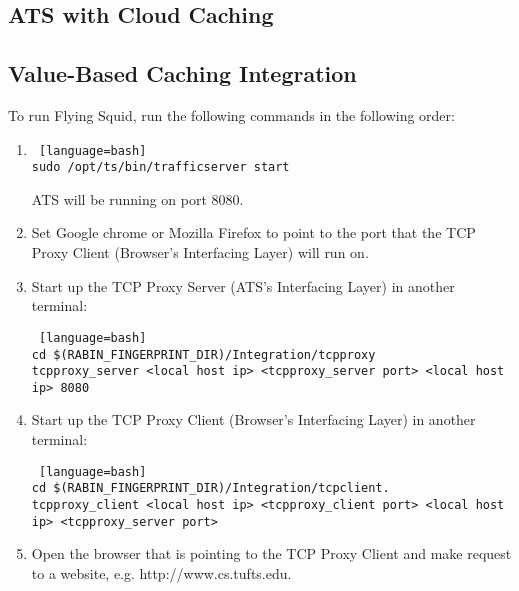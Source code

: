 \subsection{ATS with Cloud Caching}



\subsection{Value-Based Caching Integration}

To run Flying Squid, run the following commands in the following order:

\begin{enumerate}

\item 

\begin{lstlisting} [language=bash] 
sudo /opt/ts/bin/trafficserver start
\end{lstlisting}

ATS will be running on port 8080.

\item 

Set Google chrome or Mozilla Firefox to point to the port that the TCP Proxy Client (Browser's Interfacing Layer) will run on. 

\item 

Start up the TCP Proxy Server (ATS's Interfacing Layer) in another terminal:

\begin{lstlisting} [language=bash] 
cd $(RABIN_FINGERPRINT_DIR)/Integration/tcpproxy
tcpproxy_server <local host ip> <tcpproxy_server port> <local host ip> 8080
\end{lstlisting}

\item

Start up the TCP Proxy Client (Browser's Interfacing Layer) in another terminal:

\begin{lstlisting} [language=bash] 
cd $(RABIN_FINGERPRINT_DIR)/Integration/tcpclient.
tcpproxy_client <local host ip> <tcpproxy_client port> <local host ip> <tcpproxy_server port>
\end{lstlisting}

\item

Open the browser that is pointing to the TCP Proxy Client and make request to a website, e.g. http://www.cs.tufts.edu.

\end{enumerate}

